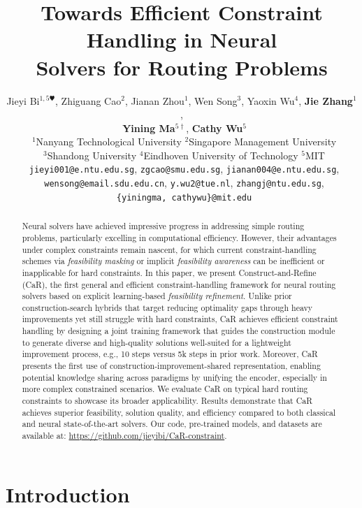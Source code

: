 \documentclass{article} %
\title{
Towards Efficient Constraint Handling in Neural \\Solvers for Routing Problems
}
\author{
  Jieyi Bi$^{1,5\varheartsuit}$, 
  Zhiguang Cao$^{2}$, 
  Jianan Zhou$^{1}$, 
  Wen Song$^{3}$, 
  Yaoxin Wu$^{4}$, 
  \textbf{Jie Zhang$^{1}$},\\
  \textbf{~Yining Ma$^{5 \dagger}$}, 
  \textbf{Cathy Wu$^5$} \\
  \noalign{\vskip 2pt}
  ~$^1$Nanyang Technological University \quad $^2$Singapore Management University \\
  ~$^3$Shandong University \quad $^4$Eindhoven University of Technology \quad $^5$MIT \\
    ~\texttt{jieyi001@e.ntu.edu.sg}, 
    \texttt{zgcao@smu.edu.sg},
    \texttt{jianan004@e.ntu.edu.sg}, \\
    ~\texttt{wensong@email.sdu.edu.cn},
    \texttt{y.wu2@tue.nl},
    \texttt{zhangj@ntu.edu.sg}, \\
    ~\texttt{\{yiningma, cathywu\}@mit.edu}
}
\begin{document}
\maketitle
{\let\thefootnote\relax{}}

\begin{abstract}

Neural solvers have achieved impressive progress in addressing simple routing problems, particularly excelling in computational efficiency. However, their advantages under complex constraints remain nascent, for which current constraint-handling schemes via \emph{feasibility masking} or implicit \emph{feasibility awareness} can be inefficient or inapplicable for hard constraints. In this paper, we present Construct-and-Refine (CaR), the first general and efficient constraint-handling framework for neural routing solvers based on explicit learning-based \emph{feasibility refinement}. Unlike prior construction-search hybrids that target reducing optimality gaps through heavy improvements yet still struggle with hard constraints, CaR achieves efficient constraint handling by designing a joint training framework that {guides the construction module to generate diverse and high-quality solutions well-suited for} a lightweight improvement process, e.g., 10 steps versus 5k steps in prior work. Moreover, CaR presents the first use of construction-improvement-shared representation, enabling potential knowledge sharing across paradigms by unifying the encoder, especially in more complex constrained scenarios. We evaluate CaR on typical hard routing constraints to showcase its broader applicability. Results demonstrate that CaR achieves superior feasibility, solution quality, and efficiency compared to both classical and neural state-of-the-art solvers. Our code, pre-trained models, and datasets are available at: \url{https://github.com/jieyibi/CaR-constraint}.
\end{abstract}

\section{Introduction}
\label{sec:intro}
\end{document}
